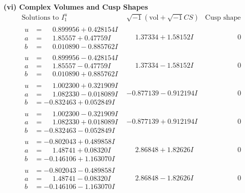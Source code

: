 \documentclass[1p]{elsarticle_modified}
\theoremstyle{definition}
\newcommand{\I}{\sqrt{-1}}
\begin{document}
\newpage\flushleft \textbf{(vi) Complex Volumes and Cusp Shapes}
$$\begin{array}{c|c|c}  
\text{Solutions to }I^u_{1}& \I (\text{vol} + \sqrt{-1}CS) & \text{Cusp shape}\\
 \hline 
\begin{aligned}
u &= \phantom{-}0.899956 + 0.428154 I \\
a &= \phantom{-}1.85557 + 0.47759 I \\
b &= \phantom{-}0.010890 - 0.885762 I\end{aligned}
 & \phantom{-}1.37334 + 1.58152 I & \phantom{-0.000000 } 0 \\ \hline\begin{aligned}
u &= \phantom{-}0.899956 - 0.428154 I \\
a &= \phantom{-}1.85557 - 0.47759 I \\
b &= \phantom{-}0.010890 + 0.885762 I\end{aligned}
 & \phantom{-}1.37334 - 1.58152 I & \phantom{-0.000000 } 0 \\ \hline\begin{aligned}
u &= \phantom{-}1.002300 + 0.321909 I \\
a &= \phantom{-}1.082330 - 0.018089 I \\
b &= -0.832463 + 0.052849 I\end{aligned}
 & -0.877139 - 0.912194 I & \phantom{-0.000000 } 0 \\ \hline\begin{aligned}
u &= \phantom{-}1.002300 - 0.321909 I \\
a &= \phantom{-}1.082330 + 0.018089 I \\
b &= -0.832463 - 0.052849 I\end{aligned}
 & -0.877139 + 0.912194 I & \phantom{-0.000000 } 0 \\ \hline\begin{aligned}
u &= -0.802043 + 0.489858 I \\
a &= \phantom{-}1.48741 + 0.08320 I \\
b &= -0.146106 + 1.163070 I\end{aligned}
 & \phantom{-}2.86848 + 1.82626 I & \phantom{-0.000000 } 0 \\ \hline\begin{aligned}
u &= -0.802043 - 0.489858 I \\
a &= \phantom{-}1.48741 - 0.08320 I \\
b &= -0.146106 - 1.163070 I\end{aligned}
 & \phantom{-}2.86848 - 1.82626 I & \phantom{-0.000000 } 0 \\ \hline\begin{aligned}

\end{aligned}
\end{array}$$
\end{document}
